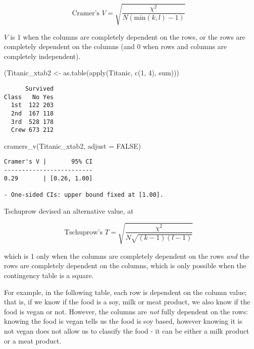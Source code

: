\documentclass[mathematics,article,submit,moreauthors,pdftex]{mdpi}
\newenvironment{Shaded}{\begin{snugshade}}{\end{snugshade}}
\newcommand{\AttributeTok}[1]{\textcolor[rgb]{0.77,0.63,0.00}{#1}}
\newcommand{\ConstantTok}[1]{\textcolor[rgb]{0.00,0.00,0.00}{#1}}
\newcommand{\DecValTok}[1]{\textcolor[rgb]{0.00,0.00,0.81}{#1}}
\newcommand{\FunctionTok}[1]{\textcolor[rgb]{0.00,0.00,0.00}{#1}}
\newcommand{\NormalTok}[1]{#1}
\newcommand{\OtherTok}[1]{\textcolor[rgb]{0.56,0.35,0.01}{#1}}
\begin{document}
\[
\text{Cramer's } V = \sqrt{\frac{\chi^2}{N(\text{min}(k,l)-1)}}
\]

\(V\) is 1 when the columns are completely dependent on the rows, or the
rows are completely dependent on the columns (and 0 when rows and
columns are completely independent).

\begin{Shaded}
\begin{Highlighting}[]
\NormalTok{(Titanic\_xtab2 }\OtherTok{\textless{}{-}} \FunctionTok{as.table}\NormalTok{(}\FunctionTok{apply}\NormalTok{(Titanic, }\FunctionTok{c}\NormalTok{(}\DecValTok{1}\NormalTok{, }\DecValTok{4}\NormalTok{), sum)))}
\end{Highlighting}
\end{Shaded}

\begin{verbatim}
      Survived
Class   No Yes
  1st  122 203
  2nd  167 118
  3rd  528 178
  Crew 673 212
\end{verbatim}

\begin{Shaded}
\begin{Highlighting}[]
\FunctionTok{cramers\_v}\NormalTok{(Titanic\_xtab2, }\AttributeTok{adjust =} \ConstantTok{FALSE}\NormalTok{)}
\end{Highlighting}
\end{Shaded}

\begin{verbatim}
Cramer's V |       95% CI
-------------------------
0.29       | [0.26, 1.00]

- One-sided CIs: upper bound fixed at [1.00].
\end{verbatim}

Tschuprow \citep{tschuprow1939principles} devised an alternative value,
at

\[
\text{Tschuprow's } T = \sqrt{\frac{\chi^2}{N\sqrt{(k-1)(l-1)}}}
\]

which is 1 only when the columns are completely dependent on the rows
\emph{and} the rows are completely dependent on the columns, which is
only possible when the contingency table is a square.

For example, in the following table, each row is dependent on the column
value; that is, if we know if the food is a soy, milk or meat product,
we also know if the food is vegan or not. However, the columns are
\emph{not} fully dependent on the rows: knowing the food is vegan tells
us the food is soy based, however knowing it is not vegan does not allow
us to classify the food - it can be either a milk product or a meat
product.
\end{document}
